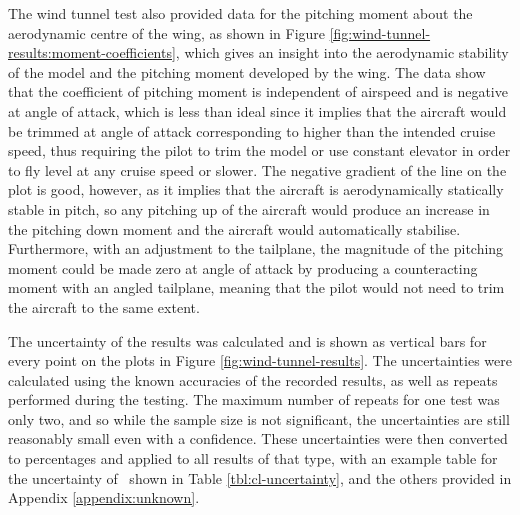 \documentclass[../../main.tex]{subfiles}
\begin{document}
The wind tunnel test also provided data for the pitching moment about the aerodynamic centre of the wing, as shown in Figure \ref{fig:wind-tunnel-results:moment-coefficients}, which gives an insight into the aerodynamic stability of the model and the pitching moment developed by the wing.
The data show that the coefficient of pitching moment is independent of airspeed and is negative at  angle of attack, which is less than ideal since it implies that the aircraft would be trimmed at  angle of attack corresponding to higher than the intended cruise speed, thus requiring the pilot to trim the model or use constant elevator in order to fly level at any cruise speed or slower.
The negative gradient of the line on the plot is good, however, as it implies that the aircraft is aerodynamically statically stable in pitch, so any pitching up of the aircraft would produce an increase in the pitching down moment and the aircraft would automatically stabilise.
Furthermore, with an adjustment to the tailplane, the magnitude of the pitching moment could be made zero at  angle of attack by producing a counteracting moment with an angled tailplane, meaning that the pilot would not need to trim the aircraft to the same extent. 

The uncertainty of the results was calculated and is shown as vertical bars for every point on the plots in Figure \ref{fig:wind-tunnel-results}.
The uncertainties were calculated using the known accuracies of the recorded results, as well as repeats performed during the testing.
The maximum number of repeats for one test was only two, and so while the sample size is not significant, the uncertainties are still reasonably small even with a  confidence.
These uncertainties were then converted to percentages and applied to all results of that type, with an example table for the uncertainty of \cl\, shown in Table \ref{tbl:cl-uncertainty}, and the others provided in Appendix \ref{appendix:unknown}.  %
\end{document}
